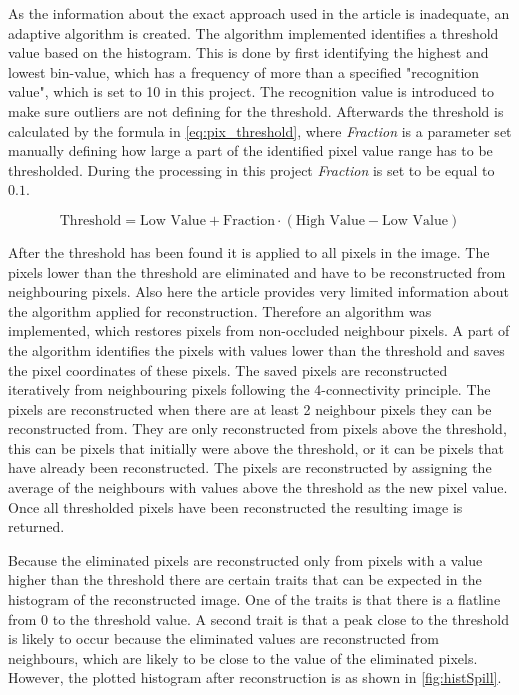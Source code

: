 As the information about the exact approach used in the article is inadequate, an adaptive algorithm is created. The algorithm implemented identifies a threshold value based on the histogram. This is done by first identifying the highest and lowest bin-value, which has a frequency of more than a specified "recognition value", which is set to 10 in this project. The recognition value is introduced to make sure outliers are not defining for the threshold. Afterwards the threshold is calculated by the formula in \autoref{eq:pix_threshold}, where \textit{Fraction} is a parameter set manually defining how large a part of the identified pixel value range has to be thresholded. During the processing in this project \textit{Fraction} is set to be equal to $0.1$. 

\begin{equation}\label{eq:pix_threshold}
	\text{Threshold}=\text{Low~Value}+\text{Fraction}\cdot(\text{High~Value}-\text{Low~Value})
\end{equation}


After the threshold has been found it is applied to all pixels in the image. The pixels lower than the threshold are eliminated and have to be reconstructed from neighbouring pixels. Also here the article provides very limited information about the algorithm applied for reconstruction. Therefore an algorithm was implemented, which restores pixels from non-occluded neighbour pixels. A part of the algorithm identifies the pixels with values lower than the threshold and saves the pixel coordinates of these pixels. The saved pixels are  reconstructed iteratively from neighbouring pixels following the 4-connectivity principle. The pixels are reconstructed when there are at least 2 neighbour pixels they can be reconstructed from. They are only reconstructed from pixels above the threshold, this can be pixels that initially were above the threshold, or it can be pixels that have already been reconstructed. The pixels are reconstructed by assigning the average of the neighbours with values above the threshold as the new pixel value. Once all thresholded pixels have been reconstructed the resulting image is returned.

Because the eliminated pixels are reconstructed only from pixels with a value higher than the threshold there are certain traits that can be expected in the histogram of the reconstructed image. One of the traits is that there is a flatline from 0 to the threshold value. A second trait is that a peak close to the threshold is likely to occur because the eliminated values are reconstructed from neighbours, which are likely to be close to the value of the eliminated pixels. However, the plotted histogram after reconstruction is as shown in \autoref{fig:histSpill}.


